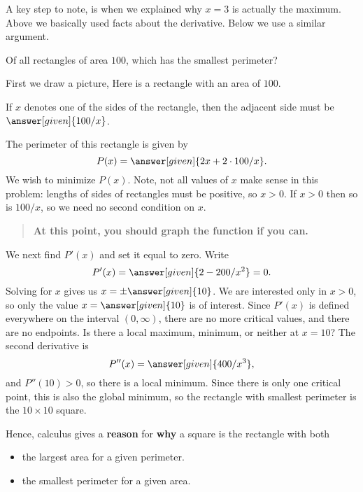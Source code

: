 \documentclass{ximera}
\begin{document}
A key step to note, is when we explained why $x=3$ is actually the
maximum. Above we basically used facts about the derivative. Below we
use a similar argument.



\begin{example}
  Of all rectangles of area $100$, which has the smallest
  perimeter?
\begin{explanation}
  First we draw a picture, Here is a rectangle with an area of $100$.
\begin{image}
\end{image}

If $x$ denotes one of the sides of the rectangle, then the adjacent
side must be $\answer[given]{100/x}$.
 
The perimeter of this rectangle is given by
\[
P(x)=\answer[given]{2x+2\cdot 100/x}.
\]
We wish to minimize $P(x)$.  Note, not all values of $x$ make sense in
this problem: lengths of sides of rectangles must be positive, so
$x>0$. If $x>0$ then so is $100/x$, so we need no second condition on
$x$.
\begin{quote}
  \textbf{At this point, you should graph the function if you can.}
\end{quote}
We next find $P'(x)$ and set it equal to zero. Write
\[
P'(x)=\answer[given]{2-200/x^2} = 0.
\]
Solving for $x$ gives us $x=\pm \answer[given]{10}$. We are interested
only in $x>0$, so only the value $x=\answer[given]{10}$ is of
interest. Since $P'(x)$ is defined everywhere on the interval
$(0,\infty)$, there are no more critical values, and there are no
endpoints. Is there a local maximum, minimum, or neither at $x=10$?
The second derivative is
\[
P''(x)=\answer[given]{400/x^3},
\]
and $P''(10)>0$, so there is a local minimum. Since there is only one
critical point, this is also the global minimum, so the rectangle with
smallest perimeter is the $10\times10$  square.
\end{explanation}
\end{example}


Hence, calculus gives a \textbf{reason} for \textbf{why} a square is
the rectangle with both
\begin{itemize}
\item the largest area for a given perimeter.
\item the smallest perimeter for a given area.
\end{itemize}
\end{document}
